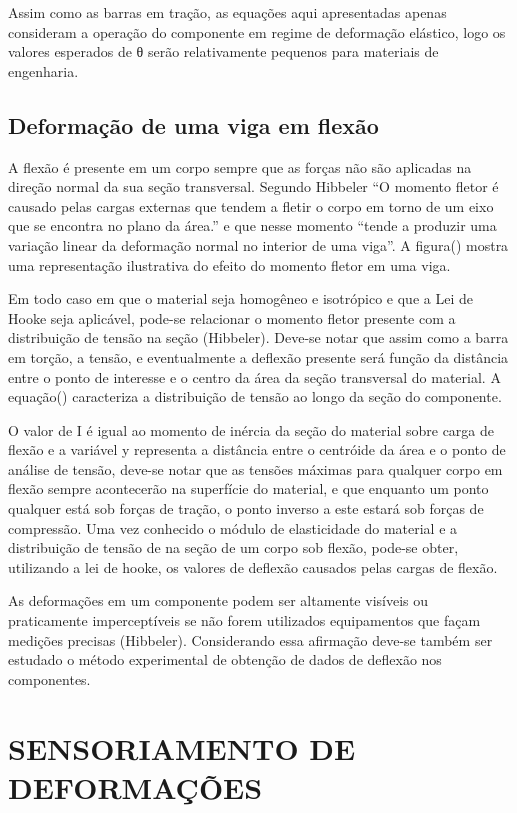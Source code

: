 Assim como as barras em tração, as equações aqui apresentadas apenas consideram a operação do componente em regime de deformação elástico, logo os valores esperados de θ serão relativamente pequenos para materiais de engenharia.

\subsection{Deformação de uma viga em flexão}

A flexão é presente em um corpo sempre que as forças não são aplicadas na direção normal da sua seção transversal. Segundo Hibbeler “O momento fletor é causado pelas cargas externas que tendem a fletir o corpo em torno de um eixo que se encontra no plano da área.” e que nesse momento “tende a produzir uma variação linear da deformação normal no interior de uma viga”.  A  figura() mostra uma representação ilustrativa do efeito do momento fletor em uma viga.

Em todo caso em que o material seja homogêneo e isotrópico e que a Lei de Hooke seja aplicável, pode-se relacionar o momento fletor presente com a distribuição de tensão na seção (Hibbeler). Deve-se notar que assim como a barra em torção, a tensão, e eventualmente a deflexão presente será função da distância entre o ponto de interesse e o centro da área da seção transversal do material. A equação() caracteriza a distribuição de tensão ao longo da seção do componente.

O valor de I é igual ao momento de inércia da seção do material sobre carga de flexão e a variável y representa a distância entre o centróide da área e o ponto de análise de tensão, deve-se notar que as tensões máximas para qualquer corpo em flexão sempre acontecerão na superfície do material, e que enquanto um ponto qualquer está sob forças de tração, o ponto inverso a este estará sob forças de compressão. Uma vez conhecido o módulo de elasticidade do material e a distribuição de tensão de na seção de um corpo sob flexão, pode-se obter, utilizando a lei de hooke, os valores de deflexão causados pelas cargas de flexão.

As deformações em um componente podem ser altamente visíveis ou praticamente imperceptíveis se não forem utilizados equipamentos que façam medições precisas (Hibbeler). Considerando essa afirmação deve-se também ser estudado o método experimental de obtenção de dados de deflexão nos componentes.

\section{SENSORIAMENTO DE DEFORMAÇÕES}

